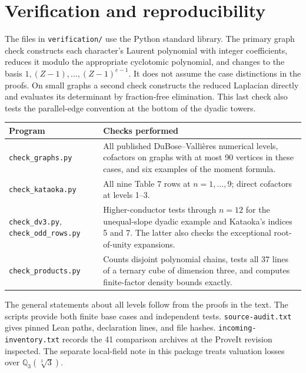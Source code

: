 \section*{Verification and reproducibility}
The files in \texttt{verification/} use the Python standard library. The
primary graph check constructs each character's Laurent polynomial with
integer coefficients, reduces it modulo the appropriate cyclotomic
polynomial, and changes to the basis $1,(Z-1),\ldots,(Z-1)^{e-1}$. It
does not assume the case distinctions in the proofs. On small graphs
a second check constructs the reduced Laplacian directly and evaluates
its determinant by fraction-free elimination. This last check also tests
the parallel-edge convention at the bottom of the dyadic towers.
\begin{center}\small
\begin{tabular}{lp{.61\linewidth}}
\toprule
Program & Checks performed\\
\midrule
\texttt{check\_graphs.py} & All published DuBose--Vallières numerical levels, cofactors on graphs with at most 90 vertices in these cases, and six examples of the moment formula.\\
\texttt{check\_kataoka.py} & All nine Table 7 rows at $n=1,\ldots,9$; direct cofactors at levels 1--3.\\
\texttt{check\_dv3.py}, \texttt{check\_odd\_rows.py} & Higher-conductor tests through $n=12$ for the unequal-slope dyadic example and Kataoka's indices 5 and 7. The latter also checks the exceptional root-of-unity expansions.\\
\texttt{check\_products.py} & Counts disjoint polynomial chains, tests all 37 lines of a ternary cube of dimension three, and computes finite-factor density bounds exactly.\\
\bottomrule
\end{tabular}
\end{center}
The general statements about all levels follow from the proofs in the
text. The scripts provide both finite base cases and independent tests.
\texttt{source-audit.txt} gives pinned Lean paths, declaration lines, and
file hashes. \texttt{incoming-inventory.txt} records the 41 comparison
archives at the ProveIt revision inspected. The separate local-field note
in this package treats valuation losses over $\mathbb Q_3(\sqrt[3]{3})$.
